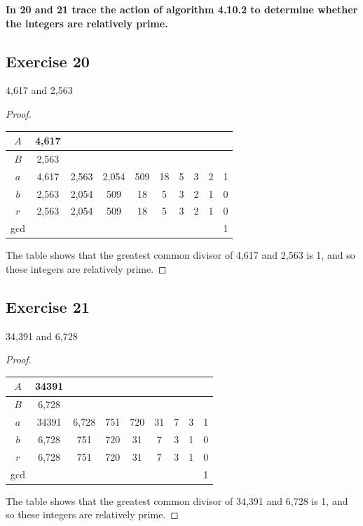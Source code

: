 \documentclass[14pt]{extarticle}
\newcommand{\cy}{\color{cyan}}
\begin{document}
{\bf \cy In 20 and 21 trace the action of algorithm 4.10.2 to determine whether the integers are relatively prime.}

\subsection{Exercise 20}
4,617 and 2,563

\begin{proof}
\begin{center}
\begin{tabular}{|c|c|c|c|c|c|c|c|c|c|}
\hline
$A$ &4,617&     &     &    &    &   &   &   &   \\
\hline
$B$ &2,563&     &     &    &    &   &   &   &   \\
\hline
$a$ &4,617&2,563&2,054& 509& 18 & 5 & 3 & 2 & 1 \\
\hline
$b$ &2,563&2,054& 509 & 18 & 5  & 3 & 2 & 1 & 0 \\
\hline
$r$ &2,563&2,054& 509 & 18 & 5  & 3 & 2 & 1 & 0 \\
\hline
gcd &     &     &     &    &    &   &   &   & 1 \\
\hline
\end{tabular}
\end{center}

The table shows that the greatest common divisor of 4,617 and 2,563 is 1, and so these integers are relatively prime.
\end{proof}

\subsection{Exercise 21}
34,391 and 6,728

\begin{proof}
\begin{center}
\begin{tabular}{|c|c|c|c|c|c|c|c|c|}
\hline
$A$ &34391&     &     &    &    &   &   &    \\
\hline
$B$ &6,728&     &     &    &    &   &   &    \\
\hline
$a$ &34391&6,728& 751 & 720& 31 & 7 & 3 & 1  \\
\hline
$b$ &6,728& 751 & 720 & 31 & 7  & 3 & 1 & 0  \\
\hline
$r$ &6,728& 751 & 720 & 31 & 7  & 3 & 1 & 0  \\
\hline
gcd &     &     &     &    &    &   &   & 1  \\
\hline
\end{tabular}
\end{center}

The table shows that the greatest common divisor of 34,391 and 6,728 is 1, and so these integers are relatively prime.
\end{proof}
\end{document}
